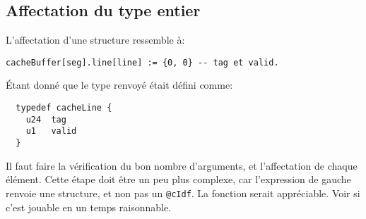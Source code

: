\documentclass[11pt]{article}
\begin{document}
\subsection{Affectation du type entier}
L'affectation d'une structure ressemble à:
\begin{lstlisting}
cacheBuffer[seg].line[line] := {0, 0} -- tag et valid.
\end{lstlisting}
Étant donné que le type renvoyé était défini comme:
\begin{lstlisting}
  typedef cacheLine {
    u24  tag
    u1   valid
  }
\end{lstlisting}
Il faut faire la vérification du bon nombre d'arguments, et l'affectation de chaque élément.
Cette étape doit être un peu plus complexe, car l'expression de gauche renvoie une structure, et non pas un \texttt{@cIdf}. La fonction serait appréciable. Voir si c'est jouable en un temps raisonnable.
\end{document}
